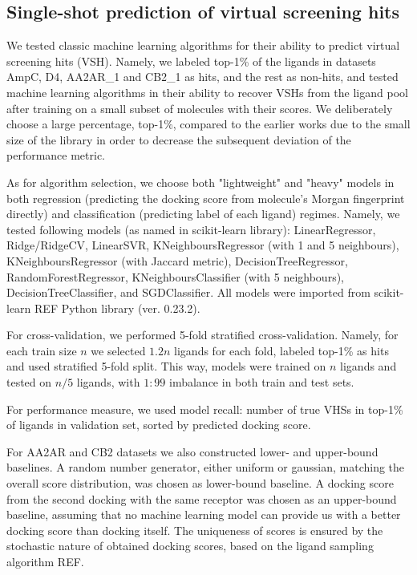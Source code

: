 \subsection{Single-shot prediction of virtual screening hits}
We tested classic machine learning algorithms for their ability to predict virtual screening hits (VSH). Namely, we labeled top-1\% of the ligands in datasets AmpC, D4, AA2AR\_1 and CB2\_1 as hits, and the rest as non-hits, and tested machine learning algorithms in their ability to recover VSHs from the ligand pool after training on a small subset of molecules with their scores. We deliberately choose a large percentage, top-1\%, compared to the earlier works \cite{Graff2021AcceleratingLearning, logistic_regression, Yang2021_shoichet_active_learning} due to the small size of the library in order to decrease the subsequent deviation of the performance metric.

As for algorithm selection, we choose both "lightweight" and "heavy" models in both regression (predicting the docking score from molecule's Morgan fingerprint directly) and classification (predicting label of each ligand) regimes. Namely, we tested following models (as named in scikit-learn library): LinearRegressor, Ridge/RidgeCV, LinearSVR, KNeighboursRegressor (with 1 and 5 neighbours), KNeighboursRegressor (with Jaccard metric), DecisionTreeRegressor, RandomForestRegressor, KNeighboursClassifier (with 5 neighbours), DecisionTreeClassifier, and SGDClassifier. All models were imported from scikit-learn REF Python library (ver. 0.23.2). 

For cross-validation, we performed 5-fold stratified cross-validation. Namely, for each train size $n$ we selected $1.2n$ ligands for each fold, labeled top-1\% as hits and used stratified 5-fold split. This way, models were trained on $n$ ligands and tested on $n/5$ ligands, with $1:99$ imbalance in both train and test sets.

For performance measure, we used model recall: number of true VHSs in top-1\% of ligands in validation set, sorted by predicted docking score.

For AA2AR and CB2 datasets we also constructed lower- and upper-bound baselines. A random number generator, either uniform or gaussian, matching the overall score distribution, was chosen as lower-bound baseline. A docking score from the second docking with the same receptor was chosen as an upper-bound baseline, assuming that no machine learning model can provide us with a better docking score than docking itself. The uniqueness of scores is ensured by the stochastic nature of obtained docking scores, based on the ligand sampling algorithm REF.

